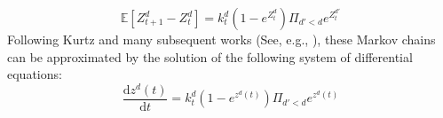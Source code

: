 \documentclass[letterpaper]{article} %
\begin{document}
\begin{equation}
    \label{eq:markov2}
    \mathbb{E}[Z_{t+1}^d-Z_t^d] = k_t^d (1- e^{Z_t^d}) \Pi_{d' < d} e^{Z_t^{d'}}
\end{equation}
Following Kurtz \cite{kurtz1971limit} and many subsequent works (See, e.g., \cite{aamand2022optimal}), these Markov chains can be approximated by the solution of the following system of differential equations:
\begin{equation}
    \label{eq:diff}
    \frac{\mathrm{d} z^d(t)}{\mathrm{d} t} =  k_t^d (1- e^{z^d(t)}) \Pi_{d' < d} e^{z^d(t)}
\end{equation}
%
\end{document}
